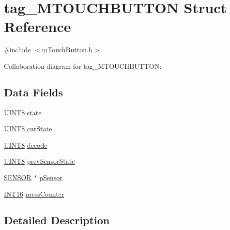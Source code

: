 \hypertarget{structtag___m_t_o_u_c_h_b_u_t_t_o_n}{}\section{tag\+\_\+\+M\+T\+O\+U\+C\+H\+B\+U\+T\+T\+O\+N Struct Reference}
\label{structtag___m_t_o_u_c_h_b_u_t_t_o_n}


{\ttfamily \#include $<$m\+Touch\+Button.\+h$>$}



Collaboration diagram for tag\+\_\+\+M\+T\+O\+U\+C\+H\+B\+U\+T\+T\+O\+N\+:
\subsection*{Data Fields}
\begin{DoxyCompactItemize}
\item 
\hyperlink{_generic_type_defs_8h_ab27e9918b538ce9d8ca692479b375b6a}{U\+I\+N\+T8} \hyperlink{structtag___m_t_o_u_c_h_b_u_t_t_o_n_a6e9c4cbd32a1178b12f3a61f6855c896}{state}
\item 
\hyperlink{_generic_type_defs_8h_ab27e9918b538ce9d8ca692479b375b6a}{U\+I\+N\+T8} \hyperlink{structtag___m_t_o_u_c_h_b_u_t_t_o_n_a0d7d80e094daab6b1e4fbcbd4c408e6f}{cur\+State}
\item 
\hyperlink{_generic_type_defs_8h_ab27e9918b538ce9d8ca692479b375b6a}{U\+I\+N\+T8} \hyperlink{structtag___m_t_o_u_c_h_b_u_t_t_o_n_a0d1a1d2d83a29c80a29bccf13569a630}{decode}
\item 
\hyperlink{_generic_type_defs_8h_ab27e9918b538ce9d8ca692479b375b6a}{U\+I\+N\+T8} \hyperlink{structtag___m_t_o_u_c_h_b_u_t_t_o_n_ae404837b36327a7f5dc7ec0945a80d8e}{prev\+Sensor\+State}
\item 
\hyperlink{m_touch_sensor_8h_a20ea6ae73be2b43f0c39bae385b66266}{S\+E\+N\+S\+O\+R} $\ast$ \hyperlink{structtag___m_t_o_u_c_h_b_u_t_t_o_n_a45185229b3c515672f69beb8d814b38c}{p\+Sensor}
\item 
\hyperlink{_generic_type_defs_8h_ad87465075f24df28ef66f25e43f0bd5a}{I\+N\+T16} \hyperlink{structtag___m_t_o_u_c_h_b_u_t_t_o_n_ad2b17e3a502fe8732111c3773fbbbc0b}{press\+Counter}
\end{DoxyCompactItemize}


\subsection{Detailed Description}


